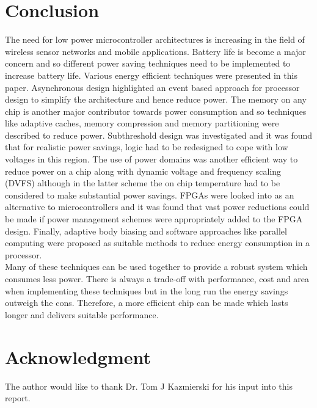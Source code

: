 \documentclass[journal]{IEEEtran}
\begin{document}
\section{Conclusion}
The need for low power microcontroller architectures is increasing in the field of wireless sensor networks and mobile applications. Battery life is become a major concern and so different power saving techniques need to be implemented to increase battery life. Various energy efficient techniques were presented in this paper. Asynchronous design highlighted an event based approach for processor design to simplify the architecture and hence reduce power. The memory on any chip is another major contributor towards power consumption and so techniques like adaptive caches, memory compression and memory partitioning were described to reduce power. Subthreshold design was investigated and it was found that for realistic power savings, logic had to be redesigned to cope with low voltages in this region. The use of power domains was another efficient way to reduce power on a chip along with dynamic voltage and frequency scaling (DVFS) although in the latter scheme the on chip temperature had to be considered to make substantial power savings. FPGAs were looked into as an alternative to microcontrollers and it was found that vast power reductions could be made if power management schemes were appropriately added to the FPGA design. Finally, adaptive body biasing and software approaches like parallel computing were proposed as suitable methods to reduce energy consumption in a processor. \\

Many of these techniques can be used together to provide a robust system which consumes less power. There is always a trade-off with performance, cost and area when implementing these techniques but in the long run the energy savings outweigh the cons. Therefore, a more efficient chip can be made which lasts longer and delivers suitable performance.


\appendices

\section*{Acknowledgment}
The author would like to thank Dr. Tom J Kazmierski for his input into this report.


\ifCLASSOPTIONcaptionsoff
  \newpage
\fi




\end{document}
